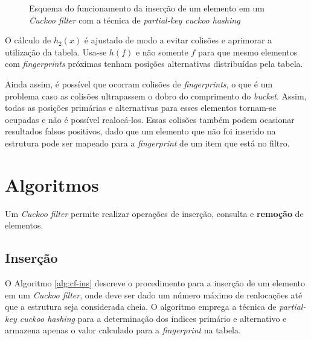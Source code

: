 \documentclass[12pt,twoside,english,brazilian]{book}
\begin{document}
\begin{figure}
\begin{center}
        \caption{\label{cuckoo-filter-insert} Esquema do funcionamento da inserção de um elemento em um \textit{Cuckoo filter} com a técnica de \textit{partial-key cuckoo hashing}}
    \end{center}
\end{figure}

O cálculo de $h_2(x)$ é ajustado de modo a evitar colisões e aprimorar a utilização da tabela. Usa-se $h(f)$ e não somente $f$ para que mesmo elementos com \textit{fingerprints} próximas tenham posições alternativas distribuídas pela tabela.

Ainda assim, é possível que ocorram colisões de \textit{fingerprints}, o que é um problema caso as colisões ultrapassem o dobro do comprimento do \textit{bucket}. Assim, todas as posições primárias e alternativas para esses elementos tornam-se ocupadas e não é possível realocá-los. Essas colisões também podem ocasionar resultados falsos positivos, dado que um elemento que não foi inserido na estrutura pode ser mapeado para a \textit{fingerprint} de um item que está no filtro.

\section{Algoritmos}

Um \textit{Cuckoo filter} permite realizar operações de inserção, consulta e \textbf{remoção} de elementos.

\subsection{Inserção}

O Algoritmo \ref{alg:cf-ins} descreve o procedimento para a inserção de um elemento em um \textit{Cuckoo filter}, onde deve ser dado um número máximo de realocações até que a estrutura seja considerada cheia. O algoritmo emprega a técnica de \textit{partial-key cuckoo hashing} para a determinação dos índices primário e alternativo e armazena apenas o valor calculado para a \textit{fingerprint} na tabela.
\end{document}
